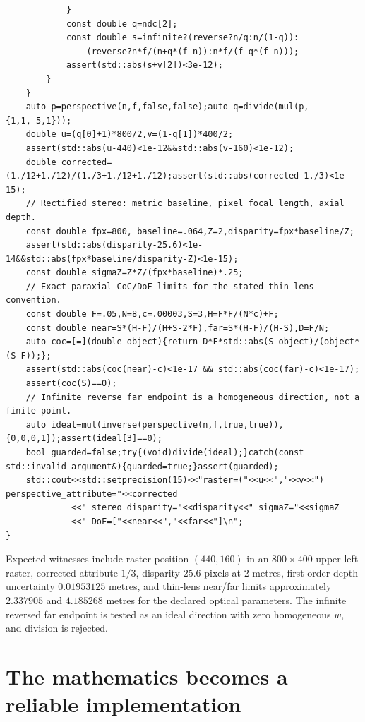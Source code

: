 \begin{verbatim}
            }
            const double q=ndc[2];
            const double s=infinite?(reverse?n/q:n/(1-q)):
                (reverse?n*f/(n+q*(f-n)):n*f/(f-q*(f-n)));
            assert(std::abs(s+v[2])<3e-12);
        }
    }
    auto p=perspective(n,f,false,false);auto q=divide(mul(p,{1,1,-5,1}));
    double u=(q[0]+1)*800/2,v=(1-q[1])*400/2;
    assert(std::abs(u-440)<1e-12&&std::abs(v-160)<1e-12);
    double corrected=(1./12+1./12)/(1./3+1./12+1./12);assert(std::abs(corrected-1./3)<1e-15);
    // Rectified stereo: metric baseline, pixel focal length, axial depth.
    const double fpx=800, baseline=.064,Z=2,disparity=fpx*baseline/Z;
    assert(std::abs(disparity-25.6)<1e-14&&std::abs(fpx*baseline/disparity-Z)<1e-15);
    const double sigmaZ=Z*Z/(fpx*baseline)*.25;
    // Exact paraxial CoC/DoF limits for the stated thin-lens convention.
    const double F=.05,N=8,c=.00003,S=3,H=F*F/(N*c)+F;
    const double near=S*(H-F)/(H+S-2*F),far=S*(H-F)/(H-S),D=F/N;
    auto coc=[=](double object){return D*F*std::abs(S-object)/(object*(S-F));};
    assert(std::abs(coc(near)-c)<1e-17 && std::abs(coc(far)-c)<1e-17);
    assert(coc(S)==0);
    // Infinite reverse far endpoint is a homogeneous direction, not a finite point.
    auto ideal=mul(inverse(perspective(n,f,true,true)),{0,0,0,1});assert(ideal[3]==0);
    bool guarded=false;try{(void)divide(ideal);}catch(const std::invalid_argument&){guarded=true;}assert(guarded);
    std::cout<<std::setprecision(15)<<"raster=("<<u<<","<<v<<") perspective_attribute="<<corrected
             <<" stereo_disparity="<<disparity<<" sigmaZ="<<sigmaZ
             <<" DoF=["<<near<<","<<far<<"]\n";
}
\end{verbatim}

Expected witnesses include raster position \((440,160)\) in an \(800\times400\) upper-left raster, corrected attribute \(1/3\), disparity \(25.6\) pixels at \(2\) metres, first-order depth uncertainty \(0.01953125\) metres, and thin-lens near/far limits approximately \(2.337905\) and \(4.185268\) metres for the declared optical parameters. The infinite reversed far endpoint is tested as an ideal direction with zero homogeneous \(w\), and division is rejected.

\section{The mathematics becomes a reliable implementation}\label{02-foundations-ii-ch037-the-mathematics-becomes-a-reliable-implementation}

\hypertarget{02-foundations-ii-ch037-the-mathematics-becomes-a-reliable-implementation}{}

